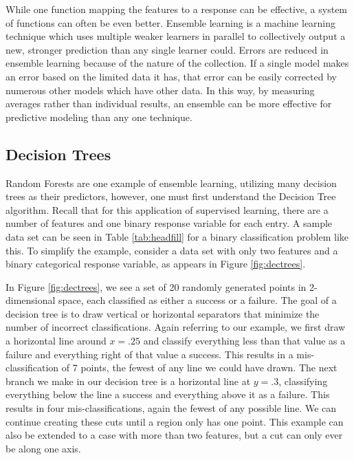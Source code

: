 While one function mapping the features to a response can be effective, a system of functions can often be even better. Ensemble learning is a machine learning technique which uses multiple weaker learners in parallel to collectively output a new, stronger prediction than any single learner could. Errors are reduced in ensemble learning because of the nature of the collection. If a single model makes an error based on the limited data it has, that error can be easily corrected by numerous other models which have other data. In this way, by measuring averages rather than individual results, an ensemble can be more effective for predictive modeling than any one technique.

\subsection{Decision Trees}
Random Forests are one example of ensemble learning, utilizing many decision trees as their predictors, however, one must first understand the Decision Tree algorithm. Recall that for this application of supervised learning, there are a number of features and one binary response variable for each entry. A sample data set can be seen in Table \ref{tab:headfill} for a binary classification problem like this. To simplify the example, consider a data set with only two features and a binary categorical response variable, as appears in Figure \ref{fig:dectrees}.

In Figure \ref{fig:dectrees}, we see a set of 20 randomly generated points in 2-dimensional space, each classified as either a success or a failure. The goal of a decision tree is to draw vertical or horizontal separators that minimize the number of incorrect classifications. Again referring to our example, we first draw a horizontal line around $x=.25$ and classify everything less than that value as a failure and everything right of that value a success. This results in a mis-classification of 7 points, the fewest of any line we could have drawn. The next branch we make in our decision tree is a horizontal line at $y=.3$, classifying everything below the line a success and everything above it as a failure. This results in four mis-classifications, again the fewest of any possible line. We can continue creating these cuts until a region only has one point. This example can also be extended to a case with more than two features, but a cut can only ever be along one axis. \newline 

